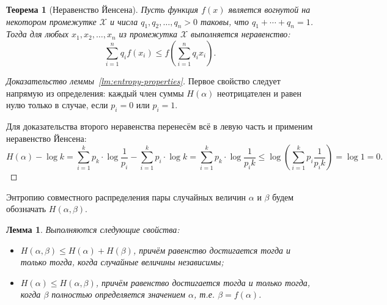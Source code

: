 \documentclass[12pt]{article}
\newcommand{\seqn}[2]{{#1}_1,{#1}_2,\dotsc,{#1}_{#2}}
\theoremstyle{definition}
\theoremstyle{plain}
\newtheorem{theorem}{Теорема}[section]
\newtheorem{lemma}{Лемма}[section]
\theoremstyle{remark}
\begin{document}
\begin{theorem}[Неравенство Йенсена]
Пусть функция \(f ( x ) \) является вогнутой на некотором промежутке \(\mathcal {X}\)
и числа \(\seqn{q}{n}>0\) таковы, что \(q_1+\dotsb +q_{n}=1\). 
Тогда для любых \(\seqn{x}{n}\) из промежутка \(\mathcal X\) выполняется неравенство:
\[
\sum _{{i=1}}^{{n}}q_{i}f(x_{i})\leq f\left(\sum _{{i=1}}^{{n}}q_{i}x_{i}\right). 
\]
\end{theorem}
\begin{proof}[Доказательство леммы~\ref{lm:entropy-properties}]
Первое свойство следует напрямую из определения: каждый член суммы \(H(\alpha)\) неотрицателен и равен нулю только в случае, если \(p_i = 0\) или \(p_i = 1\).

Для доказательства второго неравенства перенесём всё в левую часть и применим неравенство Йенсена:
\[
H(\alpha) - \log k 
= \sum_{i=1}^k p_k\cdot\log\frac{1}{p_i} - \sum_{i=1}^k p_i\cdot\log k 
= \sum_{i=1}^k p_k\cdot\log\frac{1}{p_ik} 
\le \log\left(\sum_{i=1}^k p_i\frac{1}{p_i k}\right) = \log 1 = 0.
\]
\end{proof}
Энтропию совместного распределения пары случайных величин \(\alpha\) и \(\beta\) будем обозначать \(H(\alpha,\beta)\).
\begin{lemma}
Выполняются следующие свойства:
\begin{itemize}
    \item \(H(\alpha, \beta) \le H(\alpha) + H(\beta)\), причём равенство достигается тогда и только тогда, когда случайные величины независимы;
    \item \(H(\alpha) \le H(\alpha, \beta)\), причём равенство достигается тогда и только тогда, когда \(\beta\) полностью определяется значением \(\alpha\), 
    т.е. \(\beta = f(\alpha)\).
\end{itemize}
\end{lemma}
\end{document}
